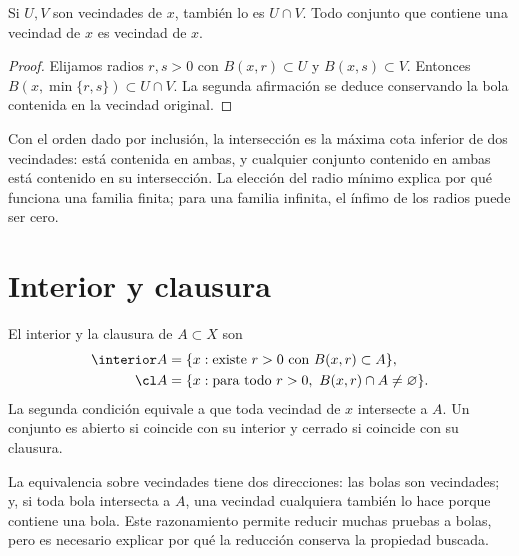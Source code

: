 \begin{proposicion}\label{ch02:vecindades}
Si $U,V$ son vecindades de $x$, también lo es $U\cap V$. Todo conjunto que contiene una vecindad de $x$ es vecindad de $x$.
\end{proposicion}
\begin{proof}
Elijamos radios $r,s>0$ con $B(x,r)\subset U$ y $B(x,s)\subset V$. Entonces $B(x,\min\{r,s\})\subset U\cap V$. La segunda afirmación se deduce conservando la bola contenida en la vecindad original.
\end{proof}
Con el orden dado por inclusión, la intersección es la máxima cota inferior de dos vecindades: está contenida en ambas, y cualquier conjunto contenido en ambas está contenido en su intersección. La elección del radio mínimo explica por qué funciona una familia finita; para una familia infinita, el ínfimo de los radios puede ser cero.

\section{Interior y clausura}
\begin{definicion}\label{ch02:interiorclausura}
El interior y la clausura de $A\subset X$ son
\begin{align*}
\interior A&=\{x:\text{existe }r>0\text{ con }B(x,r)\subset A\},\\
\cl A&=\{x:\text{para todo }r>0,\ B(x,r)\cap A\ne\varnothing\}.
\end{align*}
La segunda condición equivale a que toda vecindad de $x$ intersecte a $A$. Un conjunto es abierto si coincide con su interior y cerrado si coincide con su clausura.
\end{definicion}
La equivalencia sobre vecindades tiene dos direcciones: las bolas son vecindades; y, si toda bola intersecta a $A$, una vecindad cualquiera también lo hace porque contiene una bola. Este razonamiento permite reducir muchas pruebas a bolas, pero es necesario explicar por qué la reducción conserva la propiedad buscada.

